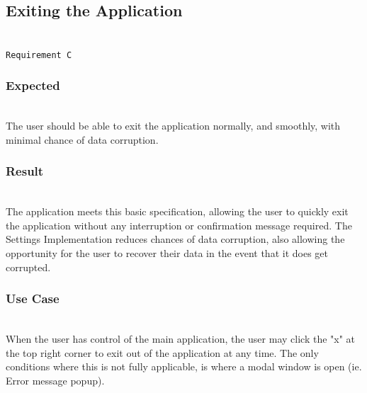 \documentclass[conference]{IEEEtran}
\begin{document}
\newpage
\subsection{Exiting the Application}~\\
\texttt{Requirement C}~\\
\subsubsection{Expected}~\\
The user should be able to exit the application normally, and smoothly, with minimal chance of data corruption.~\\

\subsubsection{Result}~\\
The application meets this basic specification, allowing the user to quickly exit the application without any interruption or confirmation message required. The Settings Implementation reduces chances of data corruption, also allowing the opportunity for the user to recover their data in the event that it does get corrupted.~\\

\subsubsection{Use Case}~\\
When the user has control of the main application, the user may click the "x" at the top right corner to exit out of the application at any time. The only conditions where this is not fully applicable, is where a modal window is open (ie. Error message popup).\\
\end{document}
